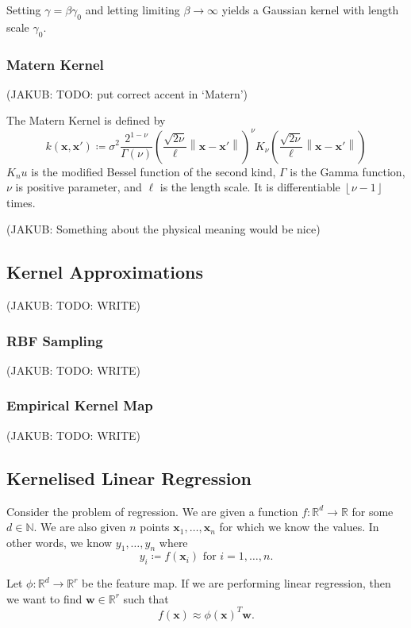 \documentclass[11pt,twoside]{report}
\newcommand\bw{\mathbf{w}}
\newcommand\bx{\mathbf{x}}
\newcommand\bbN{\mathbb{N}}
\newcommand\bbR{\mathbb{R}}
\newcommand\norm[1]{\left\|#1\right\|}
\newcommand\floor[1]{\left\lfloor#1\right\rfloor}
\newcommand\jakub[1]{{\color{red}(JAKUB: #1)}}
\begin{document}
Setting $\gamma = \beta \gamma_0$ and letting limiting $\beta \to \infty$ yields a Gaussian kernel with length scale $\gamma_0$.

\subsubsection{Matern Kernel}
\jakub{TODO: put correct accent in `Matern'}

The Matern Kernel is defined by \[
    k(\bx, \bx') \coloneqq \sigma^2\frac{2^{1-\nu}}{\Gamma(\nu)}\left(\frac{\sqrt{2\nu}}{\ell}\norm{\bx - \bx'}\right)^\nu K_\nu\left(\frac{\sqrt{2\nu}}{\ell}\norm{\bx - \bx'}\right)
\]$K_nu$ is the modified Bessel function of the second kind, $\Gamma$ is the Gamma function, $\nu$ is positive parameter, and $\ell$ is the length scale. It is differentiable $\floor{\nu-1}$ times.

\jakub{Something about the physical meaning would be nice}

\subsection{Kernel Approximations}

\jakub{TODO: WRITE}

\subsubsection{RBF Sampling}

\jakub{TODO: WRITE}

\subsubsection{Empirical Kernel Map}

\jakub{TODO: WRITE}


\subsection{Kernelised Linear Regression}

Consider the problem of regression. We are given a function $f : \bbR^d \to \bbR$ for some $d \in \bbN$. We are also given $n$ points $\bx_1, \dots, \bx_n$ for which we know the values. In other words, we know $y_1, \dots, y_n$ where \[
    y_i \coloneqq f(\bx_i)\text{ for }i = 1, \dots, n\text{.}
\]

Let $\phi : \bbR^d \to \bbR^r$ be the feature map. If we are performing linear regression, then we want to find $\bw \in \bbR^r$ such that \[
    f(\bx) \approx \phi(\bx)^T \bw \text{.}
\]
\end{document}
